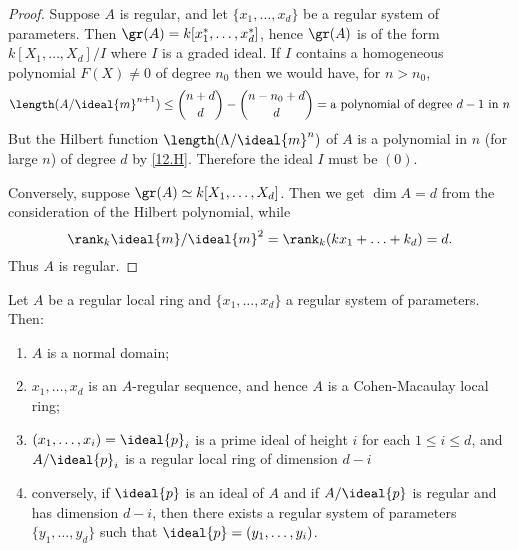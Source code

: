 \documentclass[../main]{subfiles}
\begin{document}
\begin{proof}
  Suppose $A$ is regular, and let $\{x_1, \dots, x_d\}$ be a regular system of parameters. Then $\gr(A) = k[x_1^\ast,\dots,x_d^\ast]$, hence $\gr(A)$ is of the form $k[X_1, \ldots, X_d] / I$ where $I$ is a graded ideal. If $I$ contains a homogeneous polynomial $F(X) \neq 0$ of degree $n_0$ then we would have, for $n>n_0$,
  \[\length(A/\ideal{m}^{n+1}) \leq \binom{n+d}d -\binom{n-n_0+d}d = \text{a polynomial of degree }d-1\text{ in }n\]
  But the Hilbert function $\length(\Lambda/\ideal{m}^n)$ of $A$ is a polynomial in $n$ (for large $n$) of degree $d$ by \ref{12.H}. Therefore the ideal $I$ must be $(0)$.
  
  Conversely, suppose $\gr(A) \simeq k[X_1, \ldots, X_d]$. Then we get $\dim A=d$ from the consideration of the Hilbert polynomial, while \[\rank_k \ideal{m} / \ideal{m}^2=\rank_k(k x_1+\ldots+k_d)=d.\] Thus $A$ is regular.
\end{proof}

\begin{partheorem}\label{thm:036}
  Let $A$ be a regular local ring and $\{x_1, \ldots, x_d\}$ a regular system of parameters. Then:
  \begin{enumerate}[label=(\arabic*)]
  \item $A$ is a normal domain;

  \item $x_1, \ldots, x_d$ is an $A$-regular sequence, and hence $A$ is a Cohen-Macaulay local ring;

  \item $(x_1, \ldots, x_i)=\ideal{p}_i$ is a prime ideal of height $i$ for each $1 \leqslant i \leqslant d$, and $A /\ideal{p}_i$ is a regular local ring of dimension $d-i$

  \item conversely, if $\ideal{p}$ is an ideal of $A$ and if $A / \ideal{p}$ is regular and has dimension $d-i$, then there exists a regular system of parameters $\{y_1, \ldots, y_d\}$ such that $\ideal{p}=(y_1, \ldots, y_i)$.

\end{enumerate}
\end{partheorem}
\end{document}

